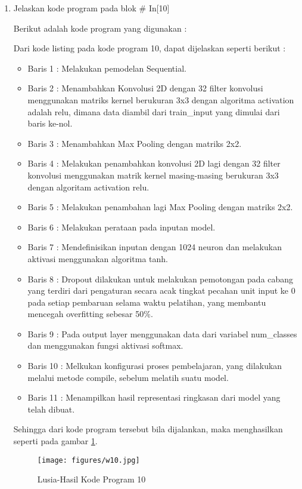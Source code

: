 \begin{enumerate}
\item Jelaskan kode program pada blok \# In[10]
\par Berikut adalah kode program yang digunakan :
	
	\par Dari kode listing pada kode program 10, dapat dijelaskan seperti berikut :
	\begin{itemize}
	\item Baris 1	: Melakukan pemodelan Sequential.
	\item Baris 2	: Menambahkan Konvolusi 2D dengan 32 filter konvolusi menggunakan matriks kernel berukuran 3x3 dengan algoritma activation adalah relu, dimana data diambil dari train\_input yang dimulai dari baris ke-nol.
	\item Baris 3	: Menambahkan Max Pooling dengan matriks 2x2.
	\item Baris 4	: Melakukan penambahkan konvolusi 2D lagi dengan 32 filter konvolusi menggunakan matrik kernel masing-masing berukuran 3x3 dengan algoritam activation relu.
	\item Baris 5	: Melakukan penambahan lagi Max Pooling dengan matriks 2x2.
	\item Baris 6	: Melakukan perataan pada inputan model.
	\item Baris 7	: Mendefinisikan inputan dengan 1024 neuron dan melakukan aktivasi menggunakan algoritma tanh.
	\item Baris 8	: Dropout dilakukan untuk melakukan pemotongan pada cabang yang terdiri dari pengaturan secara acak tingkat pecahan unit input ke 0 pada setiap pembaruan selama waktu pelatihan, yang membantu mencegah overfitting sebesar 50\%.
	\item Baris 9	: Pada output layer menggunakan data dari variabel num\_classes dan menggunakan fungsi aktivasi softmax.
	\item Baris 10 	: Melkukan konfigurasi proses pembelajaran, yang dilakukan melalui metode compile, sebelum melatih suatu model.
	\item Baris 11	: Menampilkan hasil representasi ringkasan dari model yang telah dibuat.
	\end{itemize}
	\par Sehingga dari kode program tersebut bila dijalankan, maka menghasilkan seperti pada gambar \ref{7B10}.
		\begin{figure}[!hbtp]
		\centering
		\texttt{[image: figures/w10.jpg]}
		\caption{Lusia-Hasil Kode Program 10}
		\label{7B10}
		\end{figure}


\end{enumerate}
